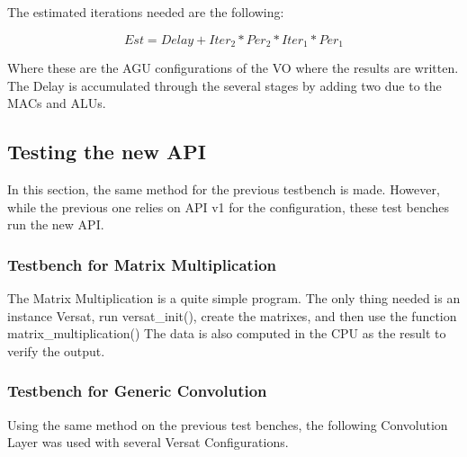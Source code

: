 \documentclass[conference]{IEEEtran}
\begin{document}

The estimated iterations needed are the following:

\[ Est=Delay+Iter_2*Per_2*Iter_1*Per_1\]

Where these are the AGU configurations of the VO where the results are written. The Delay is accumulated
through the several stages by adding two due to the MACs and ALUs.

\subsection{Testing the new API}
\label{section:testgencov}

In this section, the same method for the previous testbench is made. 
However, while the previous one relies on API v1 for the configuration, these test benches
run the new API. 

\subsubsection{Testbench for Matrix Multiplication}

The Matrix Multiplication is a quite simple program. The only thing needed is an instance Versat, run versat\_init(), create the matrixes, and then use the function matrix\_multiplication()
The data is also computed in the CPU as the result to verify the output.


\subsubsection{Testbench for Generic Convolution}

Using the same method on the previous test benches, the following Convolution Layer was used
with several Versat Configurations.
\end{document}
